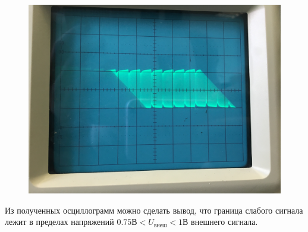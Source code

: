 \documentclass[a4paper,14pt]{extarticle}
\begin{document}
\begin{enumerate}
\begin{figure}[H]
\end{figure}
\begin{figure}[H]
	\centering
	\includegraphics[width=0.8\linewidth]{photo/IMG_3230}
\end{figure}
Из полученных осциллограмм можно сделать вывод, что граница слабого сигнала лежит в пределах напряжений $0.75\text{В}<U_\text{внеш}<1\text{В}$ внешнего сигнала.
\end{enumerate}
\end{document}

